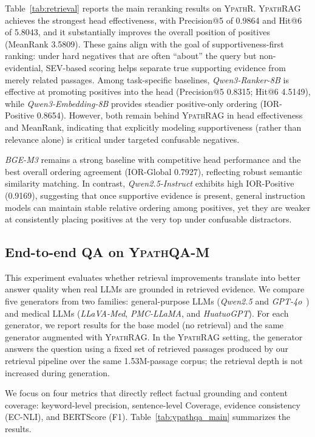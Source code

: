 \documentclass[preprint,12pt,a4paper]{elsarticle}
\newcommand{\method}{\textsc{Ypath\-RAG}}
\begin{document}
Table~\ref{tab:retrieval} reports the main reranking results on \textsc{YpathR}. \method{} achieves the strongest head effectiveness, with Precision@5 of 0.9864 and Hit@6 of 5.8043, and it substantially improves the overall position of positives (MeanRank 3.5809).
These gains align with the goal of supportiveness-first ranking: under hard negatives that are often ``about'' the query but non-evidential, SEV-based scoring helps separate true supporting evidence from merely related passages.
Among task-specific baselines, \emph{Qwen3-Ranker-8B} is effective at promoting positives into the head (Precision@5 0.8315; Hit@6 4.5149), while \emph{Qwen3-Embedding-8B} provides steadier positive-only ordering (IOR-Positive 0.8654).
However, both remain behind \method{} in head effectiveness and MeanRank, indicating that explicitly modeling supportiveness (rather than relevance alone) is critical under targeted confusable negatives.

\emph{BGE-M3} remains a strong baseline with competitive head performance and the best overall ordering agreement (IOR-Global 0.7927), reflecting robust semantic similarity matching.
In contrast, \emph{\mbox{Qwen2.5-Instruct}} exhibits high IOR-Positive (0.9169), suggesting that once supportive evidence is present, general instruction models can maintain stable relative ordering among positives, yet they are weaker at consistently placing positives at the very top under confusable distractors.

\subsection{End-to-end QA on \textsc{YpathQA-M}}
\label{subsec:exp_ypathqam}

This experiment evaluates whether retrieval improvements translate into better answer quality when real LLMs are grounded in retrieved evidence.
We compare five generators from two families: general-purpose LLMs (\emph{Qwen2.5} and \emph{GPT-4o}~\cite{openai2024gpt4o}) and medical LLMs (\emph{LLaVA-Med}, \emph{PMC-LLaMA}, and \emph{HuatuoGPT}).
For each generator, we report results for the base model (no retrieval) and the same generator augmented with \method{}.
In the \method{} setting, the generator answers the question using a fixed set of retrieved passages produced by our retrieval pipeline over the same 1.53M-passage corpus; the retrieval depth is not increased during generation.

We focus on four metrics that directly reflect factual grounding and content coverage: keyword-level precision, sentence-level Coverage, evidence consistency (EC-NLI), and BERTScore (F1).
Table~\ref{tab:ypathqa_main} summarizes the results.
\end{document}

